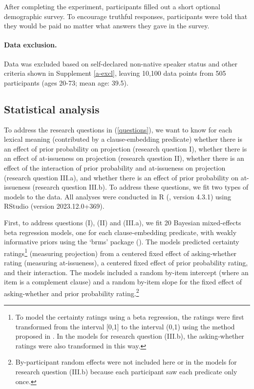 \documentclass[11pt,fleqn]{article}
\newcommand{\6}{\mbox{$[\hspace*{-.6mm}[$}}
\newcommand{\9}{\mbox{$]\hspace*{-.6mm}]$}}
\begin{document}
After completing the experiment, participants filled out a short optional demographic survey. To encourage truthful responses, participants were told that they would be paid no matter what answers they gave in the survey.

\paragraph{Data exclusion.} Data was excluded based on self-declared non-native speaker status and other criteria shown in Supplement \ref{a-excl}, leaving 10,100 data points from 505 participants (ages 20-73; mean age: 39.5).

\subsection{Statistical analysis}\label{s:stats1}

To address the research questions in (\ref{questions}), we want to know for each lexical meaning (contributed by a clause-embedding predicate) whether there is an effect of prior probability on projection (research question I), whether there is an effect of at-issueness on projection (research question II), whether there is an effect of the interaction of prior probability and at-issueness on projection (research question III.a), and whether there is an effect of prior probability on at-issueness (research question III.b). To address these questions, we fit two types of models to the data. All analyses were conducted in R (\citealt{R}, version 4.3.1) using RStudio (version 2023.12.0+369).

First, to address questions (I), (II) and (III.a), we fit 20 Bayesian mixed-effects beta regression models, one for each clause-embedding predicate, with weakly informative priors using the `brms' package (\citealt{buerkner2017}). The models predicted certainty ratings\footnote{To model the certainty ratings using a beta regression, the ratings were first transformed from the interval [0,1] to the interval (0,1) using the method proposed in \citealt{smithson-verkuilen2006}. In the models for research question (III.b), the asking-whether ratings were also transformed in this way.} (measuring projection) from a centered fixed effect of asking-whether rating (measuring at-issueness), a centered fixed effect of prior probability rating, and their interaction.  The models included a random by-item intercept (where an item is a complement clause) and a random by-item slope for the fixed effect of asking-whether and prior probability rating.\footnote{By-participant random effects were not included here or in the models for research question (III.b) because each participant saw each predicate only once.} 
\end{document}
